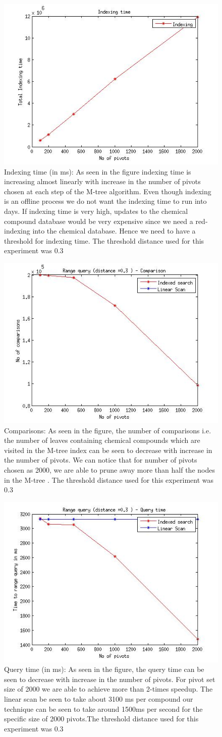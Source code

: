 \begin{figure}[ht!]	
\centering
\includegraphics[width=0.35 \columnwidth]{img/indexing_time_n200k_d3_diffpivots.jpg}
\caption{Indexing time (in ms): As seen in the figure indexing time is increasing almost linearly with increase in the number of pivots chosen at each step of the M-tree algorithm. Even though indexing is an offline process we do not want the indexing time to run into days. If indexing time is very high, updates to the chemical compound database would be very expensive since we need a red-indexing into the chemical database. Hence we need to have a threshold for indexing time. The threshold distance used for this experiment was 0.3}
\end{figure}

\begin{figure}[ht]	
\centering
\includegraphics[width=0.35 \columnwidth]{img/comparisons_n200k_d3_diffpivots.jpg}
\caption{Comparisons: As seen in the figure, the number of comparisons i.e. the number of leaves containing chemical compounds which are visited in the M-tree index can be seen to decrease with increase in the number of pivots. We can notice that for number of pivots chosen as 2000, we are able to prune away more than half the nodes in the M-tree . The threshold distance used for this experiment was 0.3}
\end{figure}

\begin{figure}[ht!]	
\centering
\includegraphics[width=0.35 \columnwidth]{img/query_time_n200k_d3_diffpivots.jpg}
\caption{Query time (in ms): As seen in the figure, the query time can be seen to decrease with increase in the number of pivots. For pivot set size of 2000 we are able to achieve more than 2-times speedup. The linear scan be seen to take about 3100 ms per compound our technique can be seen to take around 1500ms per second for the specific size of 2000 pivots.The threshold distance used for this experiment was 0.3}
\end{figure}



